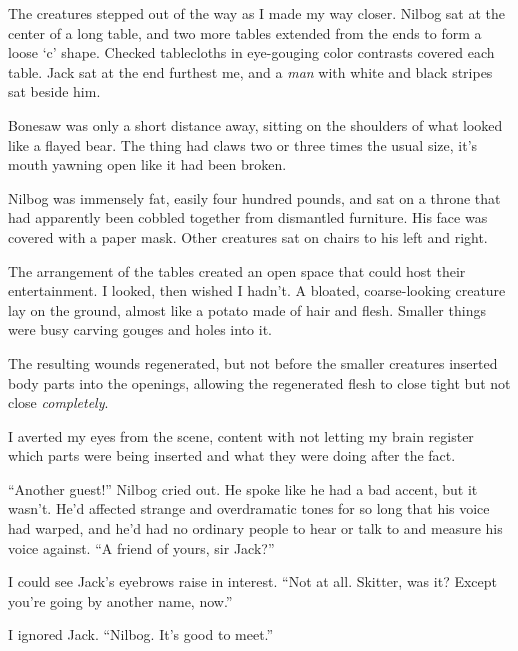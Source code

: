 The creatures stepped out of the way as I made my way closer.  Nilbog sat at the center of a long table, and two more tables extended from the ends to form a loose `c' shape.  Checked tablecloths in eye-gouging color contrasts covered each table.  Jack sat at the end furthest me, and a \emph{man} with white and black stripes sat beside him.



Bonesaw was only a short distance away, sitting on the shoulders of what looked like a flayed bear.  The thing had claws two or three times the usual size, it's mouth yawning open like it had been broken.



Nilbog was immensely fat, easily four hundred pounds, and sat on a throne that had apparently been cobbled together from dismantled furniture.  His face was covered with a paper mask.  Other creatures sat on chairs to his left and right.



The arrangement of the tables created an open space that could host their entertainment.  I looked, then wished I hadn't.  A bloated, coarse-looking creature lay on the ground, almost like a potato made of hair and flesh.  Smaller things were busy carving gouges and holes into it.



The resulting wounds regenerated, but not before the smaller creatures inserted body parts into the openings, allowing the regenerated flesh to close tight but not close \emph{completely}.



I averted my eyes from the scene, content with not letting my brain register which parts were being inserted and what they were doing after the fact.



``Another guest!'' Nilbog cried out.  He spoke like he had a bad accent, but it wasn't.  He'd affected strange and overdramatic tones for so long that his voice had warped, and he'd had no ordinary people to hear or talk to and measure his voice against.  ``A friend of yours, sir Jack?''



I could see Jack's eyebrows raise in interest.  ``Not at all.  Skitter, was it?  Except you're going by another name, now.''



I ignored Jack.  ``Nilbog.  It's good to meet.''



